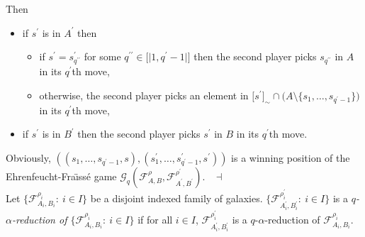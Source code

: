 \documentclass[draft]{article}
\newenvironment{proof}{{\bf Proof:}}{~$\dashv$\\}
\def\lsem{{\lbrack\mid}}
\def\rsem{{\mid\rbrack}}
\begin{document}
\begin{proof}
Then
%
%
\begin{itemize}
%
%
\item if $s^{\prime}$ is in $A^{\prime}$ then
%
%
\begin{itemize}
%
%
\item if $s^{\prime}{=}s^{\prime}_{q^{\prime\prime}}$ for some $q^{\prime\prime}{\in}\lsem1,q^{\prime}{-}1\rsem$ then the second player picks $s_{q^{\prime\prime}}$ in $A$ in its $q^{\prime}$th move,
%
%
\item otherwise, the second player picks an element in $\lbrack s^{\prime}\rbrack_{\sim}{\cap}(A{\setminus}\{s_{1},\ldots,
%
%
%
%
%
%
%
%
%
%
%
%
$\linebreak$
%
%
%
%
%
%
%
%
%
%
%
%
s_{q^{\prime}{-}1}\})$ in its $q^{\prime}$th move,
%
%
\end{itemize}
%
%
\item if $s^{\prime}$ is in $B^{\prime}$ then the second player picks $s^{\prime}$ in $B$ in its $q^{\prime}$th move.
%
%
\end{itemize}
%
%
Obviously, $((s_{1},\ldots,s_{q^{\prime}{-}1},s),(s^{\prime}_{1},\ldots,s^{\prime}_{q^{\prime}{-}1},s^{\prime}))$ is a winning position of the Eh\-renfeucht-Fra\"\i ss\'e game ${\mathcal G}_{q}({\mathcal F}_{A,B}^{\rho},{\mathcal F}_{A^{\prime},B^{\prime}}^{\rho^{\prime}})$.
%
%
\medskip
%
%
\end{proof}
%
%
Let $\{{\mathcal F}_{A_{i},B_{i}}^{\rho_{i}}:\ i{\in}I\}$ be a disjoint indexed family of galaxies.
$\{{\mathcal F}_{A_{i}^{\prime},B_{i}^{\prime}}^{\rho_{i}^{\prime}}:\ i{\in}I\}$ is a {\it $q$-$\alpha$-reduction of $\{{\mathcal F}_{A_{i},B_{i}}^{\rho_{i}}:\ i{\in}I\}$}\/ if for all $i{\in}I$, ${\mathcal F}_{A_{i}^{\prime},B_{i}^{\prime}}^{\rho_{i}^{\prime}}$ is a $q$-$\alpha$-reduction of ${\mathcal F}_{A_{i},B_{i}}^{\rho_{i}}$.
%
%
\end{document}
